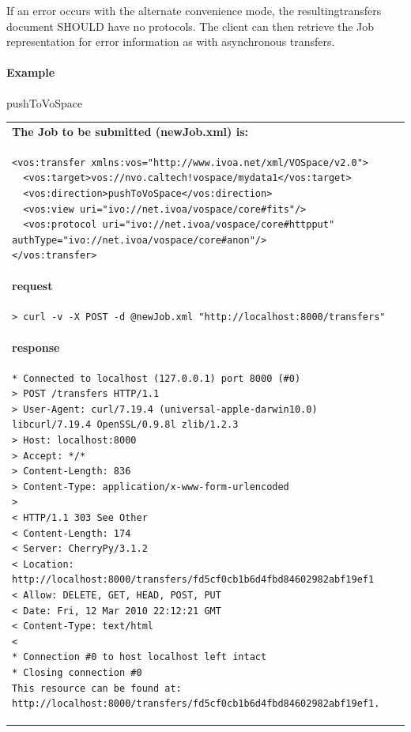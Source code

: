 \documentclass[11pt,a4paper]{ivoa}
\begin{document}
If an error occurs with the alternate convenience mode, the resultingtransfers document SHOULD have no protocols. The client can then retrieve the Job representation for error information as with asynchronous transfers.

\paragraph{Example}
pushToVoSpace

\begin{tabular}{ p{10cm} }
\\
\textbf{The Job to be submitted (newJob.xml) is:} \\
\begin{lstlisting}
<vos:transfer xmlns:vos="http://www.ivoa.net/xml/VOSpace/v2.0">   
  <vos:target>vos://nvo.caltech!vospace/mydata1</vos:target>
  <vos:direction>pushToVoSpace</vos:direction>
  <vos:view uri="ivo://net.ivoa/vospace/core#fits"/>
  <vos:protocol uri="ivo://net.ivoa/vospace/core#httpput" authType="ivo://net.ivoa/vospace/core#anon"/>
</vos:transfer>
\end{lstlisting} \\
\textbf{request} \\
\begin{lstlisting}
> curl -v -X POST -d @newJob.xml "http://localhost:8000/transfers"
\end{lstlisting} \\
\textbf{response} \\
\begin{lstlisting}
* Connected to localhost (127.0.0.1) port 8000 (#0)
> POST /transfers HTTP/1.1
> User-Agent: curl/7.19.4 (universal-apple-darwin10.0) libcurl/7.19.4 OpenSSL/0.9.8l zlib/1.2.3
> Host: localhost:8000
> Accept: */*
> Content-Length: 836
> Content-Type: application/x-www-form-urlencoded
> 
< HTTP/1.1 303 See Other
< Content-Length: 174
< Server: CherryPy/3.1.2
< Location: http://localhost:8000/transfers/fd5cf0cb1b6d4fbd84602982abf19ef1
< Allow: DELETE, GET, HEAD, POST, PUT
< Date: Fri, 12 Mar 2010 22:12:21 GMT
< Content-Type: text/html
< 
* Connection #0 to host localhost left intact
* Closing connection #0
This resource can be found at: http://localhost:8000/transfers/fd5cf0cb1b6d4fbd84602982abf19ef1.
\end{lstlisting} \\
\end{tabular}
\end{document}
